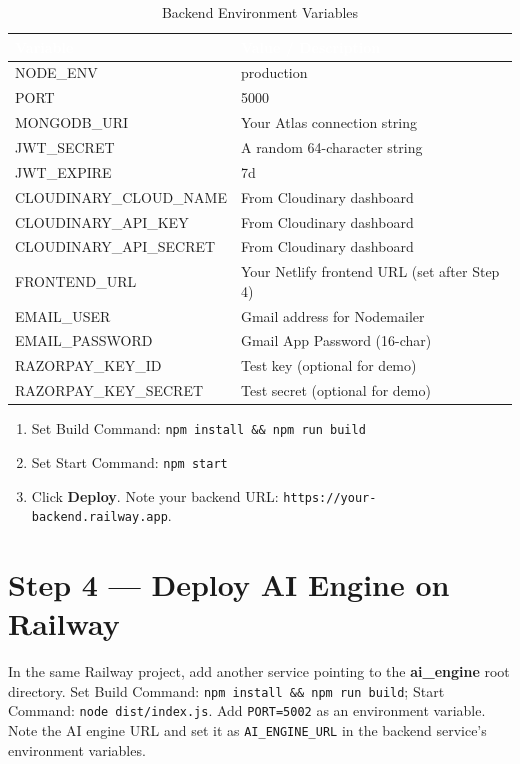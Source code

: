 \documentclass[12pt,a4paper]{report}
\newcommand{\thead}[1]{\cellcolor{tableheader}\textcolor{white}{\textbf{#1}}}
\begin{document}
\begin{table}[h!]
\centering
\caption{Backend Environment Variables}
\renewcommand{\arraystretch}{1.3}
\begin{tabular}{|p{5cm}|p{8cm}|}
\hline
\thead{Variable} & \thead{Value / Description} \\
\hline
NODE\_ENV & production \\
PORT & 5000 \\
MONGODB\_URI & Your Atlas connection string \\
JWT\_SECRET & A random 64-character string \\
JWT\_EXPIRE & 7d \\
CLOUDINARY\_CLOUD\_NAME & From Cloudinary dashboard \\
CLOUDINARY\_API\_KEY & From Cloudinary dashboard \\
CLOUDINARY\_API\_SECRET & From Cloudinary dashboard \\
FRONTEND\_URL & Your Netlify frontend URL (set after Step 4) \\
EMAIL\_USER & Gmail address for Nodemailer \\
EMAIL\_PASSWORD & Gmail App Password (16-char) \\
RAZORPAY\_KEY\_ID & Test key (optional for demo) \\
RAZORPAY\_KEY\_SECRET & Test secret (optional for demo) \\
\hline
\end{tabular}
\end{table}

\begin{enumerate}[leftmargin=*,start=4]
\item Set Build Command: \texttt{npm install \&\& npm run build}
\item Set Start Command: \texttt{npm start}
\item Click \textbf{Deploy}. Note your backend URL: \texttt{https://your-backend.railway.app}.
\end{enumerate}

\section{Step 4 — Deploy AI Engine on Railway}

In the same Railway project, add another service pointing to the \textbf{ai\_engine} root directory. Set Build Command: \texttt{npm install \&\& npm run build}; Start Command: \texttt{node dist/index.js}. Add \texttt{PORT=5002} as an environment variable. Note the AI engine URL and set it as \texttt{AI\_ENGINE\_URL} in the backend service's environment variables.
\end{document}

